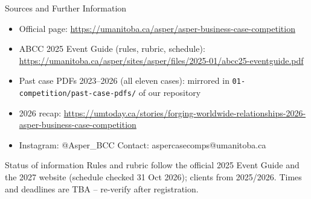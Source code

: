 \documentclass[aspectratio=169,11pt]{beamer}
\begin{document}
\begin{frame}{Sources and Further Information}
  \begin{itemize}
    \item Official page: \url{https://umanitoba.ca/asper/asper-business-case-competition}
    \item ABCC 2025 Event Guide (rules, rubric, schedule): \url{https://umanitoba.ca/asper/sites/asper/files/2025-01/abcc25-eventguide.pdf}
    \item Past case PDFs 2023--2026 (all eleven cases): mirrored in \texttt{01-competition/past-case-pdfs/} of our repository
    \item 2026 recap: \url{https://umtoday.ca/stories/forging-worldwide-relationships-2026-asper-business-case-competition}
    \item Instagram: @Asper\_BCC \quad Contact: aspercasecomps@umanitoba.ca
  \end{itemize}
  \begin{alertblock}{Status of information}
    Rules and rubric follow the official 2025 Event Guide and the 2027 website (schedule checked 31 Oct 2026); clients from 2025/2026. Times and deadlines are TBA -- re-verify after registration.
  \end{alertblock}
\end{frame}
\end{document}
